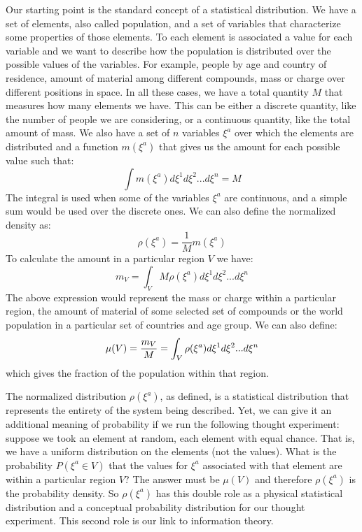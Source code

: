 \documentclass[11pt]{elsarticle}
\begin{document}
Our starting point is the standard concept of a statistical distribution. We have a set of elements, also called population, and a set of variables that characterize some properties of those elements. To each element is associated a value for each variable and we want to describe how the population is distributed over the possible values of the variables. For example, people by age and country of residence, amount of material among different compounds, mass or charge over different positions in space. In all these cases, we have a total quantity $M$ that measures how many elements we have. This can be either a discrete quantity, like the number of people we are considering, or a continuous quantity, like the total amount of mass. We also have a set of $n$ variables $\xi^a$ over which the elements are distributed and a function $m(\xi^a)$ that gives us the amount for each possible value such that:
\begin{equation}
\int m(\xi^a) d\xi^1 d\xi^2 ... d\xi^n = M
\end{equation}
The integral is used when some of the variables $\xi^a$ are continuous, and a simple sum would be used over the discrete ones. We can also define the normalized density as:
\begin{equation}
\rho(\xi^a) = \frac{1}{M}m(\xi^a)
\end{equation}
To calculate the amount in a particular region $V$ we have:
\begin{equation}
m_V = \int_V M \rho(\xi^a) d\xi^1 d\xi^2 ... d\xi^n
\end{equation}
The above expression would represent the mass or charge within a particular region, the amount of material of some selected set of compounds or the world population in a particular set of countries and age group. We can also define:
\begin{equation}
\mu(V) =\frac{m_V}{M} = \int_V \rho(\xi^a) d\xi^1 d\xi^2 ... d\xi^n \\
\end{equation}
which gives the fraction of the population within that region.

The normalized distribution $\rho(\xi^a)$, as defined, is a statistical distribution that represents the entirety of the system being described. Yet, we can give it an additional meaning of probability if we run the following thought experiment: suppose we took an element at random, each element with equal chance. That is, we have a uniform distribution on the elements (not the values). What is the probability $P(\xi^a \in V)$ that the values for $\xi^a$ associated with that element are within a particular region $V$? The answer must be $\mu(V)$ and therefore $\rho(\xi^a)$ is the probability density. So $\rho(\xi^a)$ has this double role as a physical statistical distribution and a conceptual probability distribution for our thought experiment. This second role is our link to information theory.
\end{document}
